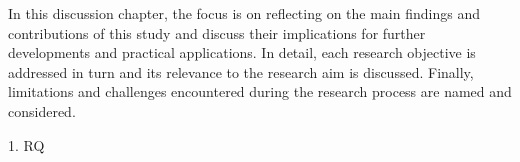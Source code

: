In this discussion chapter, the focus is on reflecting on the main findings and contributions of this study and discuss their implications for further developments and practical applications. In detail, each research objective is addressed in turn and its relevance to the research aim is discussed. Finally, limitations and challenges encountered during the research process are named and considered. 








1. RQ
